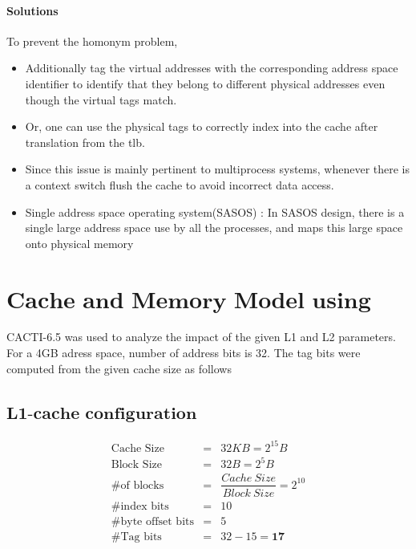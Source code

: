 \documentclass{tufte-handout}
\begin{document}
			\paragraph{Solutions} To prevent the homonym problem,
			\begin{itemize}
				\item Additionally tag the virtual addresses with the corresponding address space identifier to identify that they belong to different physical addresses even though the virtual tags match.
				\item Or, one can use the physical tags to correctly index into the cache after translation from the tlb.
				\item Since this issue is mainly pertinent to multiprocess systems, whenever there is a context switch flush the cache to avoid incorrect data access.
				\item Single address space operating system(SASOS) : In SASOS design, there is a single large address space use by all the processes, and maps this large space onto physical memory
			\end{itemize}


\section{$\textbf{Cache and Memory Model using CACTI)}$}
	CACTI-6.5 was used to analyze the impact of the given L1 and L2 parameters. For a 4GB adress space, number of address bits is 32. The tag bits were computed from the given cache size as follows
	\subsection{$\textbf{L1-cache configuration}$}
		\begin{eqnarray*}	
			\mbox{Cache Size } &=& 32 KB = 2^{15} B \\
			\mbox{Block Size} &=& 32 B = 2^5 B \\
			\mbox{\# of blocks} &=&  \dfrac{Cache\ Size}{Block\ Size} = 2^{10} \\
			\mbox{\# index bits} &=& 10 \\ 
			\mbox{\# byte offset bits} &=& 5 \\
			\mbox{\# Tag bits} &=& 32 - 15 = \mathbf{17} \\ 
		\end{eqnarray*}
\end{document}
